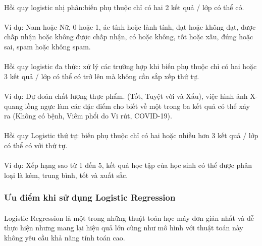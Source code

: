 \documentclass{article}
\begin{document}
\paragraph{}
Hồi quy logistic nhị phân:biến phụ thuộc chỉ có hai 2 kết quả / lớp có thể có.
\paragraph{}
Ví dụ: Nam hoặc Nữ, 0 hoặc 1, ác tính hoặc lành tính, đạt hoặc không đạt, được chấp nhận hoặc không được chấp nhận, có hoặc không, tốt hoặc xấu, đúng hoặc sai, spam hoặc không spam.

\paragraph{}Hồi quy logistic đa thức: xử lý các trường hợp khi  biến phụ thuộc chỉ có hai hoặc 3 kết quả / lớp có thể có trở lên mà không cần sắp xếp thứ tự.
 \paragraph{}
 Ví dụ: Dự đoán chất lượng thực phẩm. (Tốt, Tuyệt vời và Xấu), việc hình ảnh X-quang lồng ngực làm các đặc điểm cho biết về một trong ba kết quả có thể xảy ra (Không có bệnh, Viêm phổi do Vi rút, COVID-19).


\paragraph{}Hồi quy Logistic thứ tự: biến phụ thuộc chỉ có hai hoặc nhiều hơn 3 kết quả / lớp có thể có với thứ tự.
    \paragraph{}
    Ví dụ: Xếp hạng sao từ 1 đến 5, kết quả học tập của học sinh có thể được phân loại là kém, trung bình, tốt và xuất sắc.
  

\subsubsection{Ưu điểm khi sử dụng Logistic Regression}

\paragraph{}Logistic Regression là một trong những thuật toán học máy đơn giản nhất và dễ thực hiện nhưng mang lại hiệu quả lớn cũng như mô hình với thuật toán này không yêu cầu khả năng tính toán cao.
\end{document}
